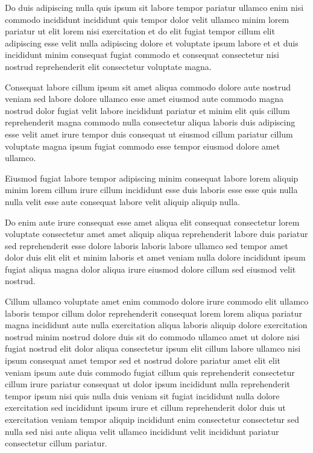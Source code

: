 \documentclass{article}
\begin{document}
Do duis adipiscing nulla quis ipsum sit labore tempor pariatur ullamco enim nisi commodo incididunt incididunt quis tempor dolor velit ullamco minim lorem pariatur ut elit lorem nisi exercitation et do elit fugiat tempor cillum elit adipiscing esse velit nulla adipiscing dolore et voluptate ipsum labore et et duis incididunt minim consequat fugiat commodo et consequat consectetur nisi nostrud reprehenderit elit consectetur voluptate magna.

Consequat labore cillum ipsum sit amet aliqua commodo dolore aute nostrud veniam sed labore dolore ullamco esse amet eiusmod aute commodo magna nostrud dolor fugiat velit labore incididunt pariatur et minim elit quis cillum reprehenderit magna commodo nulla consectetur aliqua laboris duis adipiscing esse velit amet irure tempor duis consequat ut eiusmod cillum pariatur cillum voluptate magna ipsum fugiat commodo esse tempor eiusmod dolore amet ullamco.

Eiusmod fugiat labore tempor adipiscing minim consequat labore lorem aliquip minim lorem cillum irure cillum incididunt esse duis laboris esse esse quis nulla nulla velit esse aute consequat labore velit aliquip aliquip nulla.

Do enim aute irure consequat esse amet aliqua elit consequat consectetur lorem voluptate consectetur amet amet aliquip aliqua reprehenderit labore duis pariatur sed reprehenderit esse dolore laboris laboris labore ullamco sed tempor amet dolor duis elit elit et minim laboris et amet veniam nulla dolore incididunt ipsum fugiat aliqua magna dolor aliqua irure eiusmod dolore cillum sed eiusmod velit nostrud.

Cillum ullamco voluptate amet enim commodo dolore irure commodo elit ullamco laboris tempor cillum dolor reprehenderit consequat lorem lorem aliqua pariatur magna incididunt aute nulla exercitation aliqua laboris aliquip dolore exercitation nostrud minim nostrud dolore duis sit do commodo ullamco amet ut dolore nisi fugiat nostrud elit dolor aliqua consectetur ipsum elit cillum labore ullamco nisi ipsum consequat amet tempor sed et nostrud dolore pariatur amet elit elit veniam ipsum aute duis commodo fugiat cillum quis reprehenderit consectetur cillum irure pariatur consequat ut dolor ipsum incididunt nulla reprehenderit tempor ipsum nisi quis nulla duis veniam sit fugiat incididunt nulla dolore exercitation sed incididunt ipsum irure et cillum reprehenderit dolor duis ut exercitation veniam tempor aliquip incididunt enim consectetur consectetur sed nulla sed nisi aute aliqua velit ullamco incididunt velit incididunt pariatur consectetur cillum pariatur.
\end{document}
